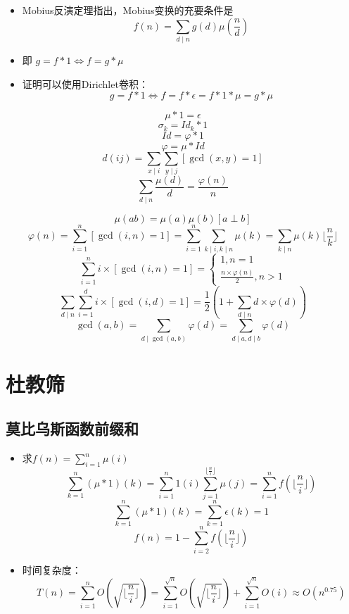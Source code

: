 \documentclass{beamer}
\begin{document}
\begin{frame}
\begin{itemize}[<+-| alert@+>]
	\item Mobius反演定理指出，Mobius变换的充要条件是$$f(n)=\sum_{d\mid n}g(d)\mu(\frac{n}{d})$$
	\item 即 $g=f*1\Leftrightarrow f=g*\mu$
	\item 证明可以使用Dirichlet卷积：$$g=f*1\Leftrightarrow f=f*\epsilon=f*1*\mu=g*\mu$$
\end{itemize}
\end{frame}

\begin{frame}
	$$\mu*1=\epsilon$$
	$$\sigma_{k}=Id_{k}*1$$
	$$Id=\varphi * 1$$
	$$\varphi=\mu*Id$$
	$$d(ij)=\sum_{x\mid i}\sum_{y\mid j}[\gcd(x,y)=1]$$
	$$\sum_{d\mid n}\frac{\mu(d)}{d}=\frac{\varphi(n)}{n}$$
\end{frame}

\begin{frame}
	$$\mu(ab)=\mu(a)\mu(b)[a\perp b]$$
	$$\varphi(n)=\sum_{i=1}^{n}[\gcd(i,n)=1]=\sum_{i=1}^{n}\sum_{k\mid i,k\mid n}\mu(k)=\sum_{k\mid n}\mu(k)\lfloor\frac{n}{k}\rfloor$$
	$$\sum_{i=1}^{n}i\times[\gcd(i,n)=1]=\begin{cases}1,n=1\\ \frac{n\times \varphi(n)}{2},n>1\end{cases}$$
	$$\sum_{d\mid n}\sum_{i=1}^{d}i\times [\gcd(i,d)=1]=\frac{1}{2}(1+\sum_{d\mid n}d\times \varphi(d))$$
	$$\gcd(a,b)=\sum_{d\mid\gcd(a,b)}\varphi(d)=\sum_{d\mid a,d\mid b}\varphi(d)$$
\end{frame}

\section{杜教筛}

\subsection{莫比乌斯函数前缀和}

\begin{frame}
\begin{itemize}[<+-| alert@+>]
	\item 求$f(n)=\sum_{i=1}^{n}\mu(i)$
	$$\sum_{k=1}^{n}(\mu*1)(k)=\sum_{i=1}^{n}1(i)\sum_{j=1}^{\lfloor\frac{n}{i}\rfloor}\mu(j)=\sum_{i=1}^{n}f(\lfloor\frac{n}{i}\rfloor)$$
	$$\sum_{k=1}^{n}(\mu*1)(k)=\sum_{k=1}^{n}\epsilon(k)=1$$
	$$f(n)=1-\sum_{i=2}^{n}f(\lfloor\frac{n}{i}\rfloor)$$
	\item 时间复杂度：$$T(n)=\sum_{i=1}^{n}O(\sqrt{\lfloor\frac{n}{i}\rfloor})=\sum_{i=1}^{\sqrt{n}}O(\sqrt{\lfloor\frac{n}{i}\rfloor})+\sum_{i=1}^{\sqrt{n}}O(i)\approx O(n^{0.75})$$
\end{itemize}
\end{frame}
\end{document}
